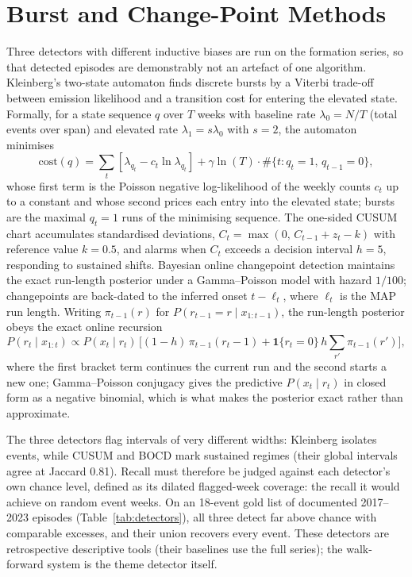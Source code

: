 \documentclass[a4paper,12pt]{report}
\begin{document}
\section{Burst and Change-Point Methods}
Three detectors with different inductive biases are run on the formation
series, so that detected episodes are demonstrably not an artefact of one
algorithm. Kleinberg's two-state automaton \citep{Kleinberg2003Bursty} finds
discrete bursts by a Viterbi trade-off between emission likelihood and a
transition cost for entering the elevated state. Formally, for a state
sequence $q$ over $T$ weeks with baseline rate $\lambda_0 = N/T$ (total
events over span) and elevated rate $\lambda_1 = s\lambda_0$ with $s = 2$,
the automaton minimises
\begin{equation}
\mathrm{cost}(q) = \sum_t \left[ \lambda_{q_t} - c_t \ln \lambda_{q_t} \right]
+ \gamma \ln(T) \cdot \#\{t : q_t = 1,\, q_{t-1} = 0\},
\label{eq:kleinberg}
\end{equation}
whose first term is the Poisson negative log-likelihood of the weekly
counts $c_t$ up to a constant and whose second prices each entry into the
elevated state; bursts are the maximal $q_t = 1$ runs of the minimising
sequence. The one-sided CUSUM chart
\citep{Page1954CUSUM} accumulates standardised deviations,
$C_t = \max(0,\, C_{t-1} + z_t - k)$ with reference value $k=0.5$, and alarms
when $C_t$ exceeds a decision interval $h=5$, responding to sustained shifts.
Bayesian online changepoint detection \citep{AdamsMacKay2007BOCD} maintains
the exact run-length posterior under a Gamma--Poisson model with hazard
$1/100$; changepoints are back-dated to the inferred onset $t - \ell_t$, where
$\ell_t$ is the MAP run length. Writing $\pi_{t-1}(r)$ for
$P(r_{t-1} = r \mid x_{1:t-1})$, the run-length posterior obeys the exact
online recursion
\begin{equation}
P(r_t \mid x_{1:t}) \propto P(x_t \mid r_t)\,\bigl[ (1-h)\, \pi_{t-1}(r_t - 1)
+ \mathbf{1}\{r_t = 0\}\, h \textstyle\sum_{r'} \pi_{t-1}(r') \bigr],
\label{eq:bocd}
\end{equation}
where the first bracket term continues the current run and the second
starts a new one; Gamma--Poisson conjugacy gives the predictive
$P(x_t \mid r_t)$ in closed form as a negative binomial, which is what
makes the posterior exact rather than approximate.

The three detectors flag intervals of very different widths: Kleinberg
isolates events, while CUSUM and BOCD mark sustained regimes (their global
intervals agree at Jaccard 0.81). Recall must therefore be judged against each detector's own
chance level, defined as its dilated flagged-week coverage: the recall it
would achieve on random event weeks. On an 18-event gold list of documented
2017--2023 episodes (Table~\ref{tab:detectors}), all three detect far above
chance with comparable excesses, and their union recovers every event.
These detectors are retrospective descriptive tools (their baselines use the
full series); the walk-forward system is the theme detector itself.
\end{document}
